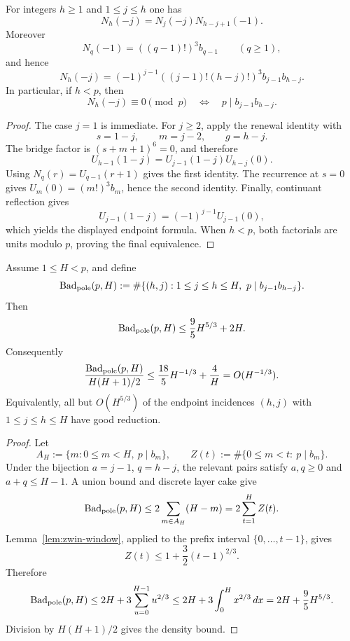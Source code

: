 \begin{lemma}\label{lem:zwin-endpoint}
For integers $h\geq1$ and $1\leq j\leq h$ one has
\[
 N_h(-j)=N_j(-j)N_{h-j+1}(-1).
\]
Moreover
\[
 N_q(-1)=((q-1)!)^3b_{q-1}
 \qquad(q\geq1),
\]
and hence
\[
 N_h(-j)
 =(-1)^{j-1}((j-1)!(h-j)!)^3b_{j-1}b_{h-j}.
\]
In particular, if $h<p$, then
\[
 N_h(-j)\equiv0\pmod p
 \quad\Longleftrightarrow\quad
 p\mid b_{j-1}b_{h-j}.
\]
\end{lemma}

\begin{proof}
The case $j=1$ is immediate.  For $j\geq2$, apply the renewal identity with
\[
 s=1-j,
 \qquad
 m=j-2,
 \qquad
 g=h-j.
\]
The bridge factor is $(s+m+1)^6=0$, and therefore
\[
 U_{h-1}(1-j)=U_{j-1}(1-j)U_{h-j}(0).
\]
Using $N_q(r)=U_{q-1}(r+1)$ gives the first identity.  The recurrence at
$s=0$ gives $U_m(0)=(m!)^3b_m$, hence the second identity.  Finally,
continuant reflection gives
\[
 U_{j-1}(1-j)=(-1)^{j-1}U_{j-1}(0),
\]
which yields the displayed endpoint formula.  When $h<p$, both factorials
are units modulo $p$, proving the final equivalence.
\end{proof}

\begin{lemma}\label{lem:zwin-good-reduction}
Assume $1\leq H<p$, and define
\[
 \operatorname{Bad}_{\rm pole}(p,H)
 :=\#\{(h,j):1\leq j\leq h\leq H,
        \ p\mid b_{j-1}b_{h-j}\}.
\]
Then
\[
 \operatorname{Bad}_{\rm pole}(p,H)
 \leq \frac95H^{5/3}+2H.
\]
Consequently
\[
 \frac{\operatorname{Bad}_{\rm pole}(p,H)}{H(H+1)/2}
 \leq \frac{18}{5}H^{-1/3}+\frac4H
 =O(H^{-1/3}).
\]
Equivalently, all but $O(H^{5/3})$ of the endpoint incidences
$(h,j)$ with $1\leq j\leq h\leq H$ have good reduction.
\end{lemma}

\begin{proof}
Let
\[
 A_H:=\{m:0\leq m<H,\ p\mid b_m\},
 \qquad
 Z(t):=\#\{0\leq m<t:\ p\mid b_m\}.
\]
Under the bijection $a=j-1$, $q=h-j$, the relevant pairs satisfy
$a,q\geq0$ and $a+q\leq H-1$.  A union bound and discrete layer cake give
\[
 \operatorname{Bad}_{\rm pole}(p,H)
 \leq2\sum_{m\in A_H}(H-m)
 =2\sum_{t=1}^H Z(t).
\]
Lemma~\ref{lem:zwin-window}, applied to the prefix interval
$\{0,\ldots,t-1\}$, gives
\[
 Z(t)\leq1+\frac32(t-1)^{2/3}.
\]
Therefore
\[
 \operatorname{Bad}_{\rm pole}(p,H)
 \leq2H+3\sum_{u=0}^{H-1}u^{2/3}
 \leq2H+3\int_0^H x^{2/3}\,dx
 =2H+\frac95H^{5/3}.
\]
Division by $H(H+1)/2$ gives the density bound.
\end{proof}
